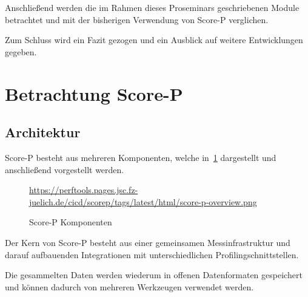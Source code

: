 \documentclass[german,proseminar,hyperref,utf8]{zihpub}
\begin{document}
    Anschlie{\ss}end werden die im Rahmen dieses Proseminars geschriebenen Module betrachtet
    und mit der bisherigen Verwendung von Score-P verglichen.

    Zum Schluss wird ein Fazit gezogen und ein Ausblick auf weitere Entwicklungen gegeben.

    \newpage
    \section{Betrachtung Score-P}
    \subsection{Architektur}
    Score-P besteht aus mehreren Komponenten, welche in~\ref{fig:score-p-overview} dargestellt
    und anschlie{\ss}end vorgestellt werden.

    \begin{figure}[ht]
        \begin{center}
                {\tiny \url{https://perftools.pages.jsc.fz-juelich.de/cicd/scorep/tags/latest/html/score-p-overview.png}}
            \caption{Score-P Komponenten}
            \label{fig:score-p-overview}
        \end{center}
    \end{figure}

    Der Kern von Score-P besteht aus einer gemeinsamen Messinfrastruktur und darauf aufbauenden
    Integrationen mit unterschiedlichen Profilingschnittstellen.

    Die gesammelten Daten werden wiederum in offenen Datenformaten gespeichert und können
    dadurch von mehreren Werkzeugen verwendet werden.
\end{document}
